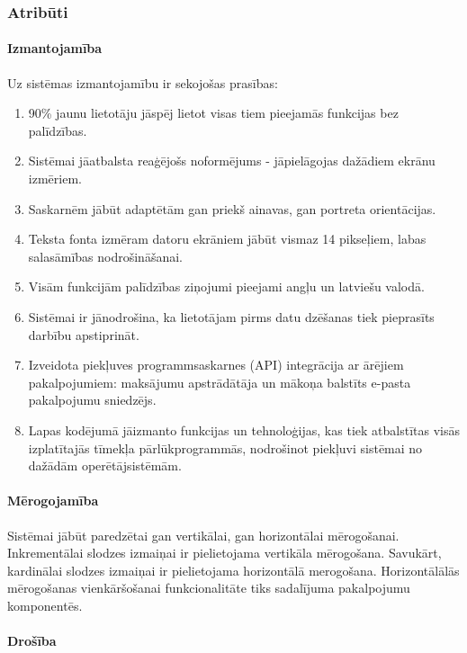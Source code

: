 \subsubsection{Atribūti}


\paragraph{Izmantojamība}

    Uz sistēmas izmantojamību ir sekojošas prasības:


    \begin{enumerate}
        \item 90\% jaunu lietotāju jāspēj lietot visas tiem pieejamās funkcijas bez palīdzības.
        \item Sistēmai jāatbalsta reaģējošs noformējums - jāpielāgojas dažādiem ekrānu izmēriem.
        \item Saskarnēm jābūt adaptētām gan priekš ainavas, gan portreta orientācijas.
        \item Teksta fonta izmēram datoru ekrāniem jābūt vismaz 14 pikseļiem, labas salasāmības nodrošināšanai.
        \item Visām funkcijām palīdzības ziņojumi pieejami angļu un latviešu valodā.
        \item Sistēmai ir jānodrošina, ka lietotājam pirms datu dzēšanas tiek pieprasīts darbību apstiprināt.
        \item Izveidota piekļuves programmsaskarnes (API) integrācija ar ārējiem pakalpojumiem: maksājumu apstrādātāja un mākoņa balstīts e-pasta pakalpojumu sniedzējs.
        \item Lapas kodējumā jāizmanto funkcijas un tehnoloģijas, kas tiek atbalstītas visās izplatītajās tīmekļa pārlūkprogrammās, nodrošinot piekļuvi sistēmai no dažādām operētājsistēmām.
    \end{enumerate}

\paragraph{Mērogojamība}

    Sistēmai jābūt paredzētai gan vertikālai, gan horizontālai mērogošanai. Inkrementālai slodzes izmaiņai ir pielietojama vertikāla mērogošana. Savukārt, kardinālai slodzes izmaiņai ir pielietojama horizontālā merogošana. Horizontālālās mērogošanas vienkāršošanai funkcionalitāte tiks sadalījuma pakalpojumu komponentēs.

    \paragraph{Drošība}


